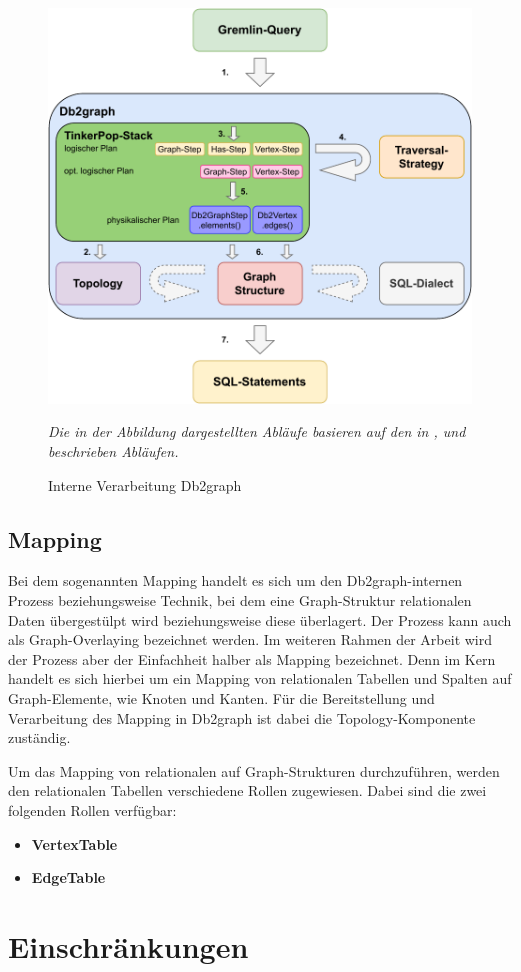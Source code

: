 \begin{figure}[h]
    \centering
    \includegraphics[width=\textwidth]{images/db2graph_intern_processing.pdf}
    \caption{Interne Verarbeitung Db2graph}
    \label{fig:db2graph_intern_processing}
    \vspace{1em}
    \textit{Die in der Abbildung dargestellten Abläufe basieren auf den in \cite{yt_tian}, \cite{vldb_tian} und \cite{sigmod_tian} beschrieben Abläufen.} 
\end{figure}

\subsection{Mapping}
Bei dem sogenannten Mapping handelt es sich um den Db2graph-internen Prozess beziehungsweise Technik, bei dem eine Graph-Struktur relationalen Daten überge\-stülpt wird beziehungsweise diese überlagert. Der Prozess kann auch als Graph-Overlaying bezeichnet werden. Im weiteren Rahmen der Arbeit wird der Prozess aber der Einfachheit halber als Mapping bezeichnet. Denn im Kern handelt es sich hierbei um ein Mapping von relationalen Tabellen und Spalten auf Graph-Elemente, wie Knoten und Kanten. Für die Bereitstellung und Verarbeitung des Mapping in Db2graph ist dabei die Topology-Komponente zuständig. 

Um das Mapping von relationalen auf Graph-Strukturen durchzuführen, werden den relationalen Tabellen verschiedene Rollen zugewiesen. Dabei sind die zwei folgenden Rollen verfügbar:
\begin{itemize}
    \item \textbf{VertexTable}\\
    \item \textbf{EdgeTable}\\
\end{itemize}

\section{Einschränkungen}
